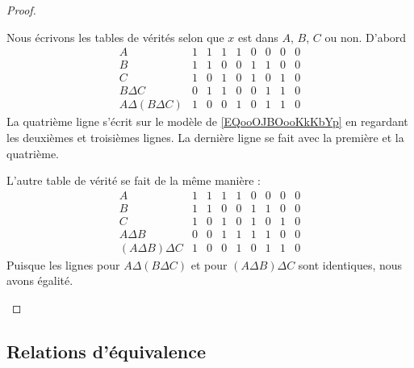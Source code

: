 \begin{proof}
\begin{subproof}
\begin{subequations}
		\end{subequations}
		Nous écrivons les tables de vérités selon que \( x\) est dans \( A\), \( B\), \( C\) ou non. D'abord
		\begin{equation}
			\begin{array}{|c|c|c|c|c|c|c|c|c|}
				A                   & 1 & 1 & 1 & 1 & 0 & 0 & 0 & 0 \\
				B                   & 1 & 1 & 0 & 0 & 1 & 1 & 0 & 0 \\
				C                   & 1 & 0 & 1 & 0 & 1 & 0 & 1 & 0 \\
				\hline%
				B\Delta C           & 0 & 1 & 1 & 0 & 0 & 1 & 1 & 0 \\
				\hline%
				A\Delta (B\Delta C) & 1 & 0 & 0 & 1 & 0 & 1 & 1 & 0
			\end{array}
		\end{equation}
		La quatrième ligne s'écrit sur le modèle de \eqref{EQooOJBOooKkKbYp} en regardant les deuxièmes et troisièmes lignes. La dernière ligne se fait avec la première et la quatrième.

		L'autre table de vérité se fait de la même manière :
		\begin{equation}
			\begin{array}{|c|c|c|c|c|c|c|c|c|}
				A                   & 1 & 1 & 1 & 1 & 0 & 0 & 0 & 0 \\
				B                   & 1 & 1 & 0 & 0 & 1 & 1 & 0 & 0 \\
				C                   & 1 & 0 & 1 & 0 & 1 & 0 & 1 & 0 \\
				\hline%
				A\Delta B           & 0 & 0 & 1 & 1 & 1 & 1 & 0 & 0 \\
				\hline%
				(A\Delta B)\Delta C & 1 & 0 & 0 & 1 & 0 & 1 & 1 & 0
			\end{array}
		\end{equation}
		Puisque les lignes pour \( A\Delta (B\Delta C)\) et pour \( (A\Delta B)\Delta C\) sont identiques, nous avons égalité.
	\end{subproof}
\end{proof}

\subsection{Relations d'équivalence}
\label{appEquivalence}

